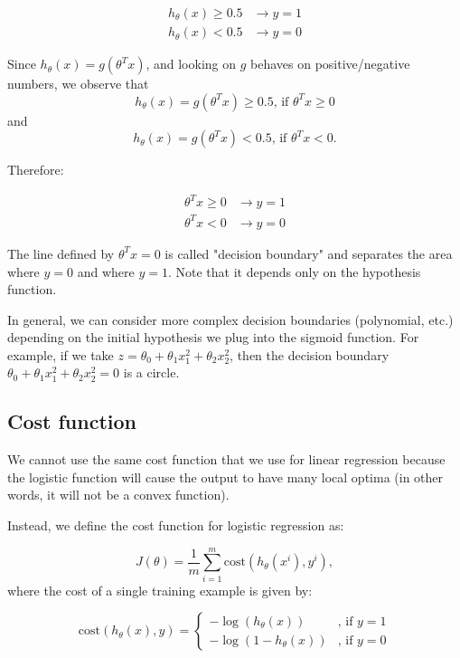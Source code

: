 \documentclass[a4paper,11pt]{report}
\newcommand{\cost}{\mathrm{cost}}
\begin{document}
\begin{align*}
  h_\theta(x) \geq 0.5 & \longrightarrow y =1 \\
  h_\theta(x) < 0.5 & \longrightarrow y = 0
\end{align*}

Since $h_\theta(x) = g(\theta^Tx)$, and looking on $g$ behaves on positive/negative numbers, we observe that $$h_\theta(x) = g(\theta^T x) \geq 0.5  \text{, if } \theta^T x \geq 0$$ and $$h_\theta(x) = g(\theta^T x) < 0.5  \text{, if } \theta^T x < 0.$$

Therefore:

\begin{align*}
  \theta^Tx \geq 0 & \longrightarrow y =1 \\
  \theta^Tx < 0 & \longrightarrow y = 0
\end{align*}

The line defined by $\theta^Tx = 0$ is called "decision boundary" and separates the area where $y = 0$ and where $y = 1$. Note that it depends only on the hypothesis function.

In general, we can consider more complex decision boundaries (polynomial, etc.) depending on the initial hypothesis we plug into the sigmoid function. For example, if we take $z = \theta_0 + \theta_1x_1^2 +\theta_2x_2^2$, then the decision boundary $\theta_0 + \theta_1x_1^2 +\theta_2x_2^2 = 0$ is a circle.

\subsection*{Cost function}

 We cannot use the same cost function that we use for linear regression because the logistic function will cause the output to have many local optima (in other words, it will not be a convex function).

Instead, we define the cost function for logistic regression as:

\begin{equation}\label{eq:log-reg-cost}
J(\theta) = \dfrac{1}{m} \sum_{i=1}^{m}{\cost(h_\theta(x^i), y^i)},
\end{equation}
where the cost of a single training example is given by:

$$\cost(h_\theta(x), y) = \left\{\begin{matrix}
                                    -\log(h_\theta(x)) & \text{, if } y = 1 \\
                                    -\log(1 - h_\theta(x)) & \text{, if } y = 0
                                  \end{matrix}\right.$$
\end{document}
